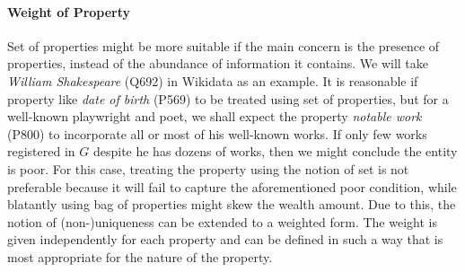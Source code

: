 \paragraph{Weight of Property}


Set of properties might be more suitable if the main concern is the presence of properties, instead of the abundance of information it contains. We will take \textit{William Shakespeare} (Q692) in Wikidata as an example. It is reasonable if property like  \textit{date of birth} (P569) to be treated using set of properties, but for a well-known playwright and poet, we shall expect the property \textit{notable work} (P800) to incorporate all or most of his well-known works. If only few works registered in \(G\) despite he has dozens of works, then we might conclude the entity is poor. For this case, treating the property using the notion of set is not preferable because it will fail to capture the aforementioned poor condition, while blatantly using bag of properties might skew the wealth amount. Due to this, the notion of (non-)uniqueness can be extended to a weighted form. The weight is given independently for each property and can be defined in such a way that is most appropriate for the nature of the property.




